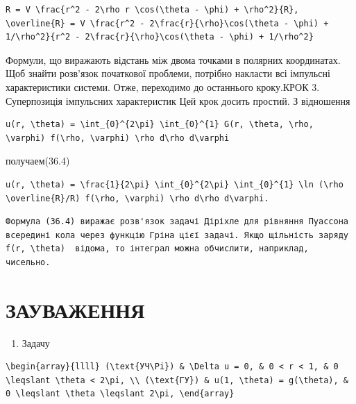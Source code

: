 \documentclass[
  ukrainian,
]{article}
\providecommand{\tightlist}{%
  \setlength{\itemsep}{0pt}\setlength{\parskip}{0pt}}
\begin{document}
\begin{verbatim}
R = V \frac{r^2 - 2\rho r \cos(\theta - \phi) + \rho^2}{R},
\overline{R} = V \frac{r^2 - 2\frac{r}{\rho}\cos(\theta - \phi) + 1/\rho^2}{r^2 - 2\frac{r}{\rho}\cos(\theta - \phi) + 1/\rho^2}
\end{verbatim}

Формули, що виражають відстань між двома точками в полярних координатах.
Щоб знайти розв'язок початкової проблеми, потрібно накласти всі
імпульсні характеристики системи. Отже, переходимо до останнього
кроку.КРОК 3. Суперпозиція імпульсних характеристик Цей крок досить
простий. З відношення

\begin{verbatim}
u(r, \theta) = \int_{0}^{2\pi} \int_{0}^{1} G(r, \theta, \rho, \varphi) f(\rho, \varphi) \rho d\rho d\varphi
\end{verbatim}

получаем(36.4)

\begin{verbatim}
u(r, \theta) = \frac{1}{2\pi} \int_{0}^{2\pi} \int_{0}^{1} \ln (\rho \overline{R}/R) f(\rho, \varphi) \rho d\rho d\varphi.
\end{verbatim}

\begin{verbatim}
Формула (36.4) виражає розв'язок задачі Діріхле для рівняння Пуассона всередині кола через функцію Гріна цієї задачі. Якщо щільність заряду  f(r, \theta)  відома, то інтеграл можна обчислити, наприклад, чисельно.
\end{verbatim}

\section{ЗАУВАЖЕННЯ}\label{ux437ux430ux443ux432ux430ux436ux435ux43dux43dux44f}

\begin{enumerate}
\def\labelenumi{\arabic{enumi}.}
\tightlist
\item
  Задачу
\end{enumerate}

\begin{verbatim}
\begin{array}{llll} (\text{УЧ\Pi}) & \Delta u = 0, & 0 < r < 1, & 0 \leqslant \theta < 2\pi, \\ (\text{ГУ}) & u(1, \theta) = g(\theta), & 0 \leqslant \theta \leqslant 2\pi, \end{array}
\end{verbatim}
\end{document}
